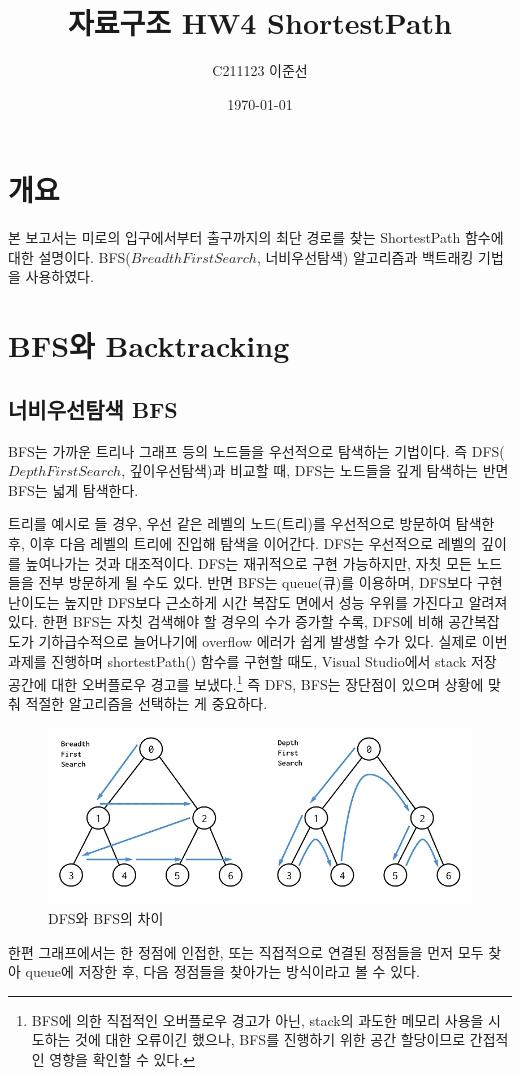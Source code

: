 \documentclass{article}
\title{자료구조 HW4 ShortestPath}
\author{C211123 이준선}
\date{\today}
\begin{document}
\maketitle
\tableofcontents
\listoffigures
\listoftables
\newpage

\section{개요}
본 보고서는 미로의 입구에서부터 출구까지의 최단 경로를 찾는 ShortestPath 함수에 대한 설명이다. BFS($Breadth First Search$, 너비우선탐색) 알고리즘과 백트래킹 기법을 사용하였다.

\section{BFS와 Backtracking}
\subsection{너비우선탐색 BFS}
BFS는 가까운 트리나 그래프 등의 노드들을 우선적으로 탐색하는 기법이다. 즉 DFS($Depth First Search$, 깊이우선탐색)과 비교할 때, DFS는 노드들을 깊게 탐색하는 반면 BFS는 넓게 탐색한다.

트리를 예시로 들 경우, 우선 같은 레벨의 노드(트리)를 우선적으로 방문하여 탐색한 후, 이후 다음 레벨의 트리에 진입해 탐색을 이어간다. DFS는 우선적으로 레벨의 깊이를 높여나가는 것과 대조적이다. DFS는 재귀적으로 구현 가능하지만, 자칫 모든 노드들을 전부 방문하게 될 수도 있다. 반면 BFS는 queue(큐)를 이용하며, DFS보다 구현 난이도는 높지만 DFS보다 근소하게 시간 복잡도 면에서 성능 우위를 가진다고 알려져 있다. 한편 BFS는 자칫 검색해야 할 경우의 수가 증가할 수록, DFS에 비해 공간복잡도가 기하급수적으로 늘어나기에 overflow 에러가 쉽게 발생할 수가 있다. 실제로 이번 과제를 진행하며 shortestPath() 함수를 구현할 때도, Visual Studio에서 stack 저장 공간에 대한 오버플로우 경고를 보냈다.\footnote{BFS에 의한 직접적인 오버플로우 경고가 아닌, stack의 과도한 메모리 사용을 시도하는 것에 대한 오류이긴 했으나, BFS를 진행하기 위한 공간 할당이므로 간접적인 영향을 확인할 수 있다.} 즉 DFS, BFS는 장단점이 있으며 상황에 맞춰 적절한 알고리즘을 선택하는 게 중요하다.
\begin{figure} [h]
    \includegraphics[width = \textwidth]{images_vagabondms_post_037c243c-108a-49c6-ae6a-abb3673532ca_image.png}
    \caption{DFS와 BFS의 차이\footnotemark}
    \label{fig:DFS_BFS}
\end{figure}
한편 그래프에서는 한 정점에 인접한, 또는 직접적으로 연결된 정점들을 먼저 모두 찾아 queue에 저장한 후, 다음 정점들을 찾아가는 방식이라고 볼 수 있다.
\end{document}
